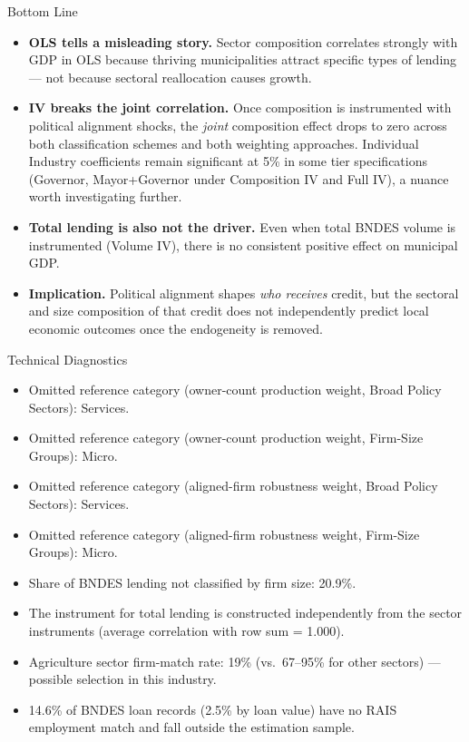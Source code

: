 \documentclass[aspectratio=169,11pt]{beamer}
\begin{document}
\begin{frame}{Bottom Line}
\begin{itemize}\setlength{\itemsep}{0.5em}
\item \textbf{OLS tells a misleading story.} Sector composition correlates strongly with GDP in OLS because thriving municipalities attract specific types of lending --- not because sectoral reallocation causes growth.
\item \textbf{IV breaks the joint correlation.} Once composition is instrumented with political alignment shocks, the \textit{joint} composition effect drops to zero across both classification schemes and both weighting approaches. Individual Industry coefficients remain significant at 5\% in some tier specifications (Governor, Mayor+Governor under Composition IV and Full IV), a nuance worth investigating further.
\item \textbf{Total lending is also not the driver.} Even when total BNDES volume is instrumented (Volume IV), there is no consistent positive effect on municipal GDP.
\item \textbf{Implication.} Political alignment shapes \textit{who receives} credit, but the sectoral and size composition of that credit does not independently predict local economic outcomes once the endogeneity is removed.
\end{itemize}
\end{frame}

\begin{frame}{Technical Diagnostics}
\begin{itemize}\setlength{\itemsep}{0.4em}
\item Omitted reference category (owner-count production weight, Broad Policy Sectors): Services.
\item Omitted reference category (owner-count production weight, Firm-Size Groups): Micro.
\item Omitted reference category (aligned-firm robustness weight, Broad Policy Sectors): Services.
\item Omitted reference category (aligned-firm robustness weight, Firm-Size Groups): Micro.
\item Share of BNDES lending not classified by firm size: 20.9\%.
\item The instrument for total lending is constructed independently from the sector instruments (average correlation with row sum = 1.000).
\item Agriculture sector firm-match rate: 19\% (vs.\ 67--95\% for other sectors) --- possible selection in this industry.
\item 14.6\% of BNDES loan records (2.5\% by loan value) have no RAIS employment match and fall outside the estimation sample.
\end{itemize}
\end{frame}
\end{document}
